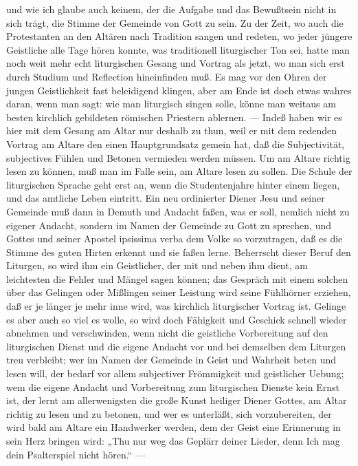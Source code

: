 und wie ich glaube auch keinem, der die Aufgabe und das Bewußtsein nicht in sich trägt, die Stimme der Gemeinde von Gott zu sein. Zu der Zeit, wo auch die Protestanten an den Altären nach Tradition sangen und redeten, wo jeder jüngere Geistliche alle Tage hören konnte, was traditionell liturgischer Ton sei, hatte man noch weit mehr echt liturgischen Gesang und Vortrag als jetzt, wo man sich erst durch Studium und Reflection hineinfinden muß. Es mag vor den Ohren der jungen Geistlichkeit fast beleidigend klingen, aber am Ende ist doch etwas wahres daran, wenn man sagt: wie man liturgisch singen solle, könne man weitaus am besten kirchlich gebildeten römischen Priestern ablernen. — Indeß haben wir es hier mit dem Gesang am Altar nur deshalb zu thun, weil er mit dem redenden Vortrag am Altare den einen Hauptgrundsatz gemein hat, daß die Subjectivität, subjectives Fühlen und Betonen vermieden werden müssen. Um am Altare richtig lesen zu können, muß man im Falle sein, am Altare lesen zu sollen. Die Schule der liturgischen Sprache geht erst an, wenn die Studentenjahre hinter einem liegen, und das amtliche Leben eintritt. Ein neu ordinierter Diener Jesu und seiner Gemeinde muß dann in Demuth und Andacht faßen, was er soll, nemlich nicht zu eigener Andacht, sondern im Namen der Gemeinde zu Gott zu sprechen, und Gottes und seiner Apostel ipsissima verba dem Volke so vorzutragen, daß es die Stimme des guten Hirten erkennt und sie faßen lerne. Beherrscht dieser Beruf den Liturgen, so wird ihm ein Geistlicher, der mit und neben ihm dient, am leichtesten die
Fehler und Mängel sagen können; das Gespräch mit einem solchen über das Gelingen oder Mißlingen seiner Leistung wird seine Fühlhörner erziehen, daß er je länger je mehr inne wird, was kirchlich liturgischer Vortrag ist. Gelinge es aber auch so viel es wolle, so wird doch Fähigkeit und Geschick schnell wieder abnehmen und verschwinden, wenn nicht die geistliche Vorbereitung auf den liturgischen Dienst und die eigene Andacht vor und bei demselben dem Liturgen treu verbleibt; wer im Namen der Gemeinde in Geist und Wahrheit beten und lesen will, der bedarf vor allem subjectiver Frömmigkeit und geistlicher Uebung; wem die eigene Andacht und Vorbereitung zum liturgischen Dienste kein Ernst ist, der lernt am allerwenigsten die große Kunst heiliger Diener Gottes, am Altar richtig zu lesen und zu betonen, und wer es unterläßt, sich vorzubereiten, der wird bald am Altare ein Handwerker werden, dem der Geist eine Erinnerung in sein Herz bringen wird: „Thu nur weg das Geplärr deiner Lieder, denn Ich mag dein Psalterspiel nicht hören.“ —

